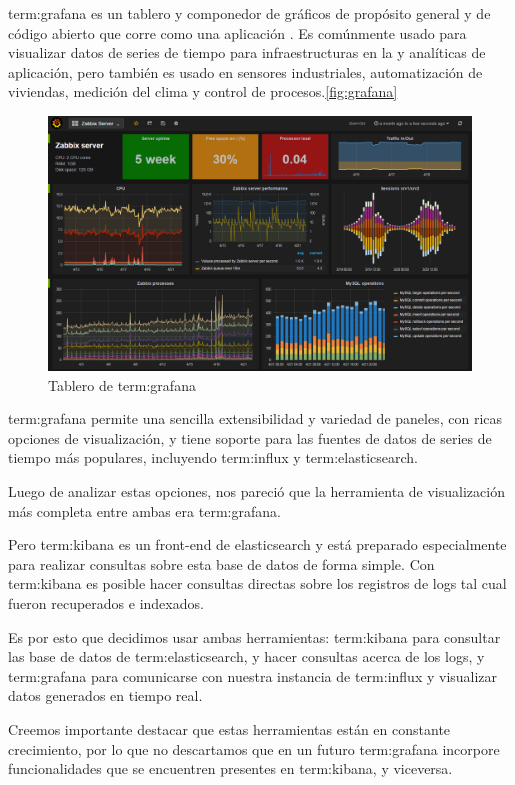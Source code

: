 \gls{term:grafana} es un tablero y componedor de gráficos de propósito general
y de código abierto que corre como una aplicación . Es comúnmente
usado para visualizar datos de series de tiempo para infraestructuras en la
 y analíticas de aplicación, pero también es usado en sensores
industriales, automatización de viviendas, medición del clima y control de
procesos.\autoref{fig:grafana}

\begin{figure}
  \includegraphics[width=\linewidth]{src/images/05-capitulo-5/grafana.png}
  \caption{Tablero de \gls{term:grafana}}
  \label{fig:grafana}
\end{figure}

\gls{term:grafana} permite una sencilla extensibilidad y variedad de paneles,
con ricas opciones de visualización, y tiene soporte para las fuentes de datos
de series de tiempo más populares, incluyendo \gls{term:influx} y
\gls{term:elasticsearch}.

Luego de analizar estas opciones, nos pareció que la herramienta de
visualización más completa entre ambas era \gls{term:grafana}.

Pero \gls{term:kibana} es un front-end de elasticsearch y está preparado
especialmente para realizar consultas sobre esta base de datos de forma simple.
Con \gls{term:kibana} es posible hacer consultas directas sobre los registros
de logs tal cual fueron recuperados e indexados.

Es por esto que decidimos usar ambas herramientas: \gls{term:kibana} para
consultar las base de datos de \gls{term:elasticsearch}, y hacer consultas
acerca de los logs, y \gls{term:grafana} para comunicarse con nuestra instancia
de \gls{term:influx} y visualizar datos generados en tiempo real.

Creemos importante destacar que estas herramientas están en constante
crecimiento, por lo que no descartamos que en un futuro \gls{term:grafana}
incorpore funcionalidades que se encuentren presentes en \gls{term:kibana}, y
viceversa.
